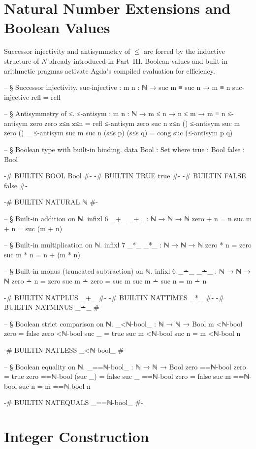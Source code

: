 \documentclass[11pt,a4paper]{book}
\def\mathbb#1{#1}%
\begin{document}
\section{Natural Number Extensions and Boolean Values}

Successor injectivity and antisymmetry of $\le$ are forced by the inductive
structure of $\mathbb{N}$ already introduced in Part~III. Boolean values and
built-in arithmetic pragmas activate Agda's compiled evaluation for efficiency.

\begin{code}
-- § Successor injectivity.
suc-injective : {m n : ℕ} → suc m ≡ suc n → m ≡ n
suc-injective refl = refl

-- § Antisymmetry of ≤.
≤-antisym : {m n : ℕ} → m ≤ n → n ≤ m → m ≡ n
≤-antisym {zero} {zero} z≤n z≤n = refl
≤-antisym {zero} {suc n} z≤n ()
≤-antisym {suc m} {zero} () _
≤-antisym {suc m} {suc n} (s≤s p) (s≤s q) = cong suc (≤-antisym p q)

-- § Boolean type with built-in binding.
data Bool : Set where
  true  : Bool
  false : Bool

{-# BUILTIN BOOL  Bool  #-}
{-# BUILTIN TRUE  true  #-}
{-# BUILTIN FALSE false #-}

{-# BUILTIN NATURAL ℕ #-}

-- § Built-in addition on ℕ.
infixl 6 _+_
_+_ : ℕ → ℕ → ℕ
zero  + n = n
suc m + n = suc (m + n)

-- § Built-in multiplication on ℕ.
infixl 7 _*_
_*_ : ℕ → ℕ → ℕ
zero  * n = zero
suc m * n = n + (m * n)

-- § Built-in monus (truncated subtraction) on ℕ.
infixl 6 _∸_
_∸_ : ℕ → ℕ → ℕ
zero  ∸ n     = zero
suc m ∸ zero  = suc m
suc m ∸ suc n = m ∸ n

{-# BUILTIN NATPLUS  _+_ #-}
{-# BUILTIN NATTIMES _*_ #-}
{-# BUILTIN NATMINUS _∸_ #-}

-- § Boolean strict comparison on ℕ.
_<ℕ-bool_ : ℕ → ℕ → Bool
m <ℕ-bool zero   = false
zero <ℕ-bool suc _ = true
suc m <ℕ-bool suc n = m <ℕ-bool n

{-# BUILTIN NATLESS _<ℕ-bool_ #-}

-- § Boolean equality on ℕ.
_==ℕ-bool_ : ℕ → ℕ → Bool
zero  ==ℕ-bool zero    = true
zero  ==ℕ-bool (suc _) = false
suc _ ==ℕ-bool zero    = false
suc m ==ℕ-bool suc n   = m ==ℕ-bool n

{-# BUILTIN NATEQUALS _==ℕ-bool_ #-}
\end{code}

\section{Integer Construction}
\end{document}
